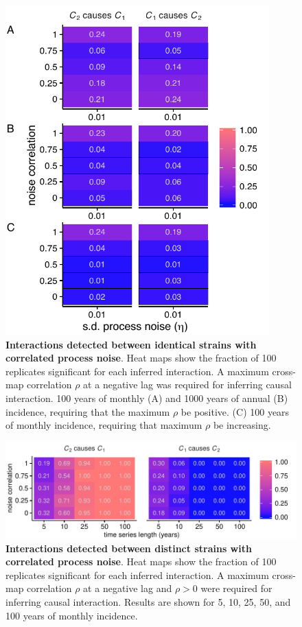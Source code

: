 \begin{figure}%
\begin{center}
  \includegraphics[width=4in]{dataflow/out/fig_detect_corrproc_identical/fig_detect_corrproc_identical.pdf}
  \end{center}
  \caption{\textbf{Interactions detected between identical strains with correlated process noise}. Heat maps show the fraction of 100 replicates significant for each inferred interaction. A maximum cross-map correlation $\rho$ at a negative lag was required for inferring causal interaction. 100 years of monthly (A) and 1000 years of annual (B) incidence, requiring that the maximum $\rho$ be positive. (C) 100 years of monthly incidence, requiring that maximum $\rho$ be increasing.  \label{fig:detect_corrproc_identical}}
\end{figure}

\begin{figure}%
\begin{center}
  \includegraphics[width=6in]{dataflow/out/fig_detect_corrproc_distinct/fig_detect_corrproc_distinct.pdf}
  \end{center}
  \caption{\textbf{Interactions detected between distinct strains with correlated process noise}. Heat maps show the fraction of 100 replicates significant for each inferred interaction. A maximum cross-map correlation $\rho$ at a negative lag and $\rho>0$ were required for inferring causal interaction. Results are shown for 5, 10, 25, 50, and 100 years of monthly incidence.  \label{fig:detect_corrproc_distinct}}
\end{figure}

